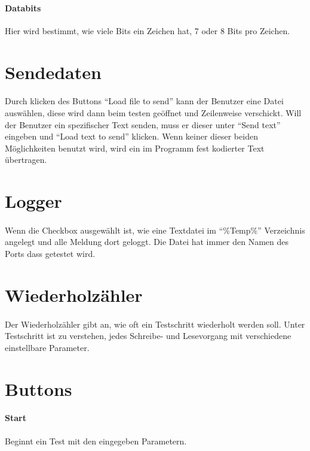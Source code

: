 \paragraph{Databits} Hier wird bestimmt, wie viele Bits ein Zeichen hat, 7 oder 8 Bits pro Zeichen.

\section{Sendedaten}
\paragraph{}
Durch klicken des Buttons "`Load file to send"' kann der Benutzer eine Datei auswählen, diese wird dann beim testen geöffnet und Zeilenweise verschickt. Will der Benutzer ein spezifischer Text senden, muss er dieser unter "`Send text"' eingeben und "`Load text to send"' klicken. Wenn keiner dieser beiden Möglichkeiten benutzt wird, wird ein im Programm fest kodierter Text übertragen.

\section{Logger}
\paragraph{}
Wenn die Checkbox ausgewählt ist, wie eine Textdatei im "`\%Temp\%"' Verzeichnis angelegt und alle Meldung dort geloggt. Die Datei hat immer den Namen des Ports dass getestet wird.

\section{Wiederholzähler}
\paragraph{}
Der Wiederholzähler gibt an, wie oft ein Testschritt wiederholt werden soll. Unter Testschritt ist zu verstehen, jedes Schreibe- und Lesevorgang mit verschiedene einstellbare Parameter.

\section{Buttons}
\paragraph{Start} Beginnt ein Test mit den eingegeben Parametern.
